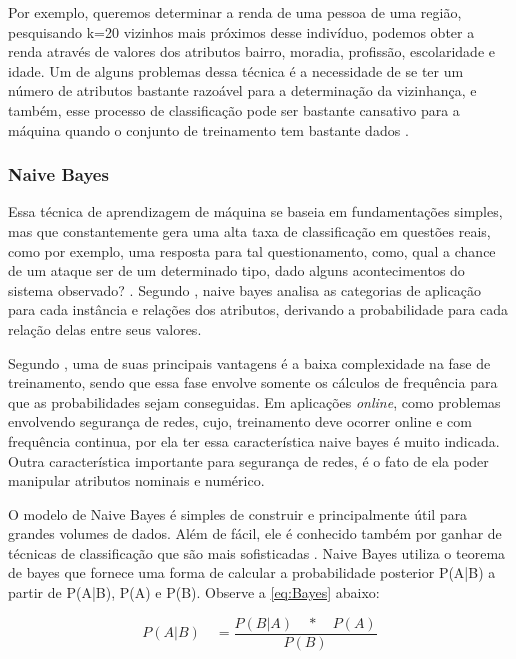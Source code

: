 \par
Por exemplo, queremos determinar a renda de uma pessoa de uma região, pesquisando k=20 vizinhos mais próximos desse indivíduo, podemos obter a renda através de valores dos atributos bairro, moradia, profissão, escolaridade e idade. Um de alguns problemas dessa técnica é a necessidade de se ter um número de atributos bastante razoável para a determinação da vizinhança, e também, esse processo de classificação pode ser bastante cansativo para a máquina quando o conjunto de treinamento tem bastante dados \cite{Cortes2002, Henke2011}.

\subsubsection{Naive Bayes}

\par
Essa técnica de aprendizagem de máquina se baseia em fundamentações simples, mas que constantemente gera uma alta taxa de classificação em questões reais, como por exemplo, uma resposta para tal questionamento, como, qual a chance de um ataque ser de um determinado tipo, dado alguns acontecimentos do sistema observado? \cite{Henke2011}. Segundo , naive bayes analisa as categorias de aplicação para cada instância e relações dos atributos, derivando a probabilidade para cada relação delas entre seus valores.

\par
Segundo \cite{Henke2011}, uma de suas principais vantagens é a baixa complexidade na fase de treinamento, sendo que essa fase envolve somente os cálculos de frequência para que as probabilidades sejam conseguidas. Em aplicações \textit{online}, como problemas envolvendo segurança de redes, cujo, treinamento deve ocorrer online e com frequência continua, por ela ter essa característica naive bayes é muito indicada. Outra característica importante para segurança de redes, é o fato de ela poder manipular atributos nominais e numérico.

\par
O modelo de Naive Bayes é simples de construir e principalmente útil para grandes volumes de dados. Além de fácil, ele é conhecido também por ganhar de técnicas de classificação que são mais sofisticadas \cite{Sunil}. Naive Bayes utiliza o teorema de bayes que fornece uma forma de calcular a probabilidade posterior P(A|B) a partir de  P(A|B), P(A) e P(B). Observe a \autoref{eq:Bayes} abaixo:

\begin{equation}
    \label{eq:Bayes}
        {P(A|B)\quad =\frac { P(B|A)\quad *\quad P(A) }{ P(B) } }
\end{equation}

